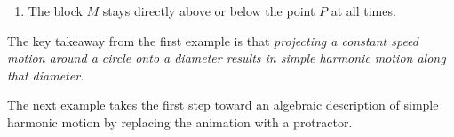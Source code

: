 \documentclass{ximera}
\begin{document}
\begin{example}
\begin{enumerate}
\begin{enumerate}
\item The block $M$ stays directly above or below the point $P$ at all times.

\end{enumerate}







\end{enumerate}
\end{example}

The key takeaway from the first example is that \emph{projecting a constant speed motion around a circle onto a diameter results in simple harmonic motion along that diameter}.  

The next example takes the first step toward an algebraic description of simple harmonic motion by replacing the animation with a protractor.
\end{document}
